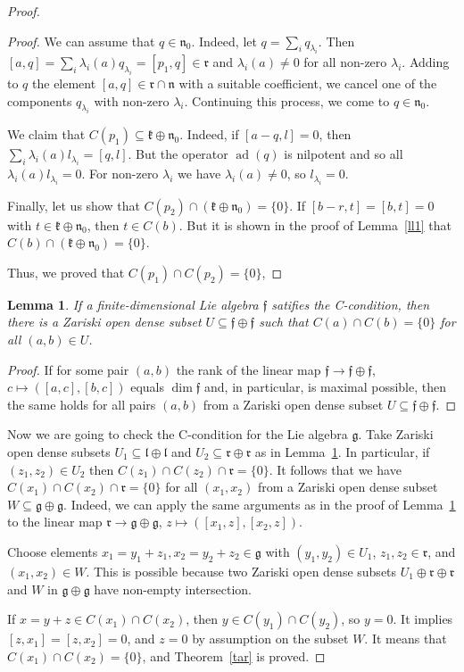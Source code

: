 \documentclass[a4paper,draft,reqno,12pt]{amsart}
\newtheorem{lemma}{Lemma}
\theoremstyle{definition}
\theoremstyle{remark}
\DeclareMathOperator{\ad}{ad}
\def\ggg{\mathfrak{g}}
\def\fff{\mathfrak{f}}
\def\nnn{\mathfrak{n}}
\def\kkk{\mathfrak{k}}
\def\lll{\mathfrak{l}}
\def\rrr{\mathfrak{r}}
\begin{document}
\begin{proof}
\begin{proof}
We can assume that $q\in\nnn_0$. Indeed, let $q=\sum_i q_{\lambda_i}$. Then $[a,q]=\sum_i\lambda_i(a)q_{\lambda_i}=[p_1,q]\in\rrr$ and $\lambda_i(a)\ne 0$ for all non-zero $\lambda_i$. Adding to $q$ the element $[a,q]\in\rrr\cap\nnn$ with a suitable coefficient, we cancel one of the components $q_{\lambda_i}$ with non-zero $\lambda_i$. Continuing this process, we come to $q\in\nnn_0$.

We claim that $C(p_1)\subseteq\kkk\oplus\nnn_0$. Indeed, if $[a-q,l]=0$, then $\sum_i\lambda_i(a)l_{\lambda_i}=[q,l]$. But the operator $\ad(q)$ is nilpotent and so all $\lambda_i(a)l_{\lambda_i}=0$. For non-zero $\lambda_i$ we have $\lambda_i(a)\ne 0$, so $l_{\lambda_i}=0$. 

Finally, let us show that $C(p_2)\cap(\kkk\oplus\nnn_0)=\{0\}$. If $[b-r,t]=[b,t]=0$ with $t\in\kkk\oplus\nnn_0$, then $t\in C(b)$. But it is shown in the proof of Lemma~\ref{ll1} that
$C(b)\cap(\kkk\oplus\nnn_0)=\{0\}$.

Thus, we proved that $C(p_1)\cap C(p_2)=\{0\}$, 
\end{proof}

\begin{lemma}
\label{lemmel}
If a finite-dimensional Lie algebra $\fff$ satifies the C-condition, then there is a Zariski open dense subset $U\subseteq\fff\oplus\fff$ such that $C(a)\cap C(b)=\{0\}$ for all $(a,b)\in U$.
\end{lemma}

\begin{proof}
If for some pair $(a,b)$ the rank of the linear map $\fff\to\fff\oplus\fff$, $c\mapsto ([a,c],[b,c])$ equals $\dim\fff$ and, in particular, is maximal possible, then the same holds for all pairs
$(a,b)$ from a Zariski open dense subset $U \subseteq\fff\oplus\fff$. 
\end{proof}

Now we are going to check the C-condition for the Lie algebra $\ggg$. Take Zariski open dense subsets $U_1\subseteq\lll\oplus\lll$ and $U_2\subseteq\rrr\oplus\rrr$ as in Lemma~\ref{lemmel}. In particular, if $(z_1,z_2)\in U_2$ then $C(z_1)\cap C(z_2)\cap\rrr=\{0\}$. It follows that we have $C(x_1)\cap C(x_2)\cap\rrr=\{0\}$ for all $(x_1,x_2)$ from 
a Zariski open dense subset $W\subseteq\ggg\oplus\ggg$. Indeed, we can apply the same arguments as in the proof of Lemma~\ref{lemmel} to the linear map $\rrr\to\ggg\oplus\ggg$,
$z\mapsto ([x_1,z],[x_2,z])$.

Choose elements $x_1=y_1+z_1, x_2=y_2+z_2\in\ggg$ with $(y_1,y_2)\in U_1$, $z_1,z_2\in\rrr$, and $(x_1,x_2)\in W$. This is possible because two Zariski open dense subsets $U_1\oplus\rrr\oplus\rrr$ and $W$ in $\ggg\oplus\ggg$ have non-empty intersection. 

If $x=y+z\in C(x_1)\cap C(x_2)$, then $y\in C(y_1)\cap C(y_2)$, so $y=0$. It implies $[z,x_1]=[z,x_2]=0$, and $z=0$ by assumption on the subset $W$. It means that $C(x_1)\cap C(x_2)=\{0\}$, and Theorem~\ref{tar} is proved.
\end{proof} 
\end{document}

